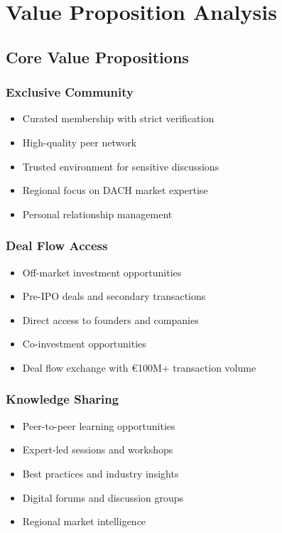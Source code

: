 \chapter{Value Proposition Analysis}

\section{Core Value Propositions}

\subsection{Exclusive Community}
\begin{itemize}
    \item Curated membership with strict verification
    \item High-quality peer network
    \item Trusted environment for sensitive discussions
    \item Regional focus on DACH market expertise
    \item Personal relationship management
\end{itemize}

\subsection{Deal Flow Access}
\begin{itemize}
    \item Off-market investment opportunities
    \item Pre-IPO deals and secondary transactions
    \item Direct access to founders and companies
    \item Co-investment opportunities
    \item Deal flow exchange with €100M+ transaction volume
\end{itemize}

\subsection{Knowledge Sharing}
\begin{itemize}
    \item Peer-to-peer learning opportunities
    \item Expert-led sessions and workshops
    \item Best practices and industry insights
    \item Digital forums and discussion groups
    \item Regional market intelligence
\end{itemize}

